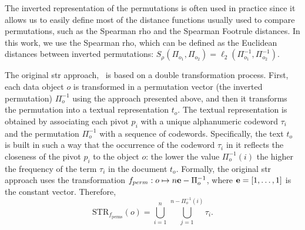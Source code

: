 The inverted representation of the permutations is often used in practice since it allows us to easily define most of the distance functions usually used to compare permutations, such as the Spearman rho and the Spearman Footrule distances.
In this work, we use the Spearman rho, which can be defined as the Euclidean distances between inverted permutations: $S_\rho (\Pi_{o_1},\Pi_{o_2})=\ell_2(\Pi^{-1}_{o_1},\Pi^{-1}_{o_2})$.

The original \gls{str} approach,~\cite{gennaro2010approach} is based on a double transformation process.
First, each data object $o$ is transformed in a permutation vector (the inverted permutation) $\Pi^{-1}_{o}$ using the approach presented above, and then it transforms the permutation into a textual representation $t_o$.
The textual representation is obtained by associating each pivot $p_i$ with a unique alphanumeric codeword $\tau_i$ and the permutation $\Pi^{-1}_{o}$ with a sequence of codewords.
Specifically, the text $t_o$ is built in such a way that the occurrence of the codeword $\tau_i$ in it reflects the closeness of the pivot $p_i$ to the object $o$: the lower the value $\Pi^{-1}_{o}(i)$ the higher the frequency of the term $\tau_i$ in the document $t_o$.
Formally, the original \gls{str} approach uses the transformation
$
f_{perm} : o \mapsto n\e - \Pi^{-1}_{o} %
$,
where $\mathbf{e}=[1,\dots, 1]$ is the constant vector.
Therefore,
\begin{equation}
\text{STR}_{f_\text{perms}}(o)=\bigcup_{i=1}^n\,\bigcup_{j=1}^{n-\Pi^{-1}_{o}(i)} \tau_i.
\end{equation}

